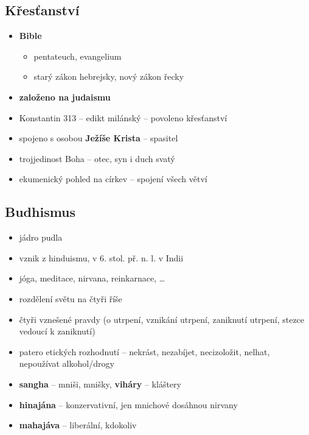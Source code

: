 \subsection{Křesťanství}
\begin{itemize}
\item \textbf{Bible}
	\begin{itemize}
	\item pentateuch, evangelium
	\item starý zákon hebrejsky, nový zákon řecky
	\end{itemize}
\item\textbf{ založeno na judaismu}
\item Konstantin 313 -- edikt milánský -- povoleno křesťanství
\item spojeno s osobou \textbf{Ježíše Krista} -- spasitel
\item trojjedinost Boha -- otec, syn i duch svatý
\item ekumenický pohled na církev -- spojení všech větví
\end{itemize}

\subsection{Budhismus}
\begin{itemize}
\item jádro pudla
\item vznik z hinduismu, v 6. stol. př. n. l. v Indii
\item jóga, meditace, nirvana, reinkarnace, \ldots
\item rozdělení světu na čtyři říše
\item čtyři vznešené pravdy (o utrpení, vznikání utrpení, zaniknutí utrpení, stezce vedoucí k zaniknutí)
\item patero etických rozhodnutí -- nekrást, nezabíjet, necizoložit, nelhat, nepoužívat alkohol/drogy
\item \textbf{sangha} -- mniši, mnišky, \textbf{viháry} -- kláštery
\item \textbf{hinajána} -- konzervativní, jen mnichové dosáhnou nirvany
\item \textbf{mahajáva} -- liberální, kdokoliv
\end{itemize}

